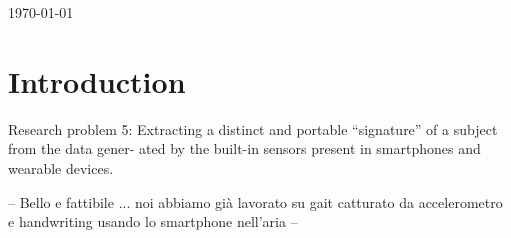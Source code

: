 \documentclass[12pt]{article}
\begin{document}
\begin{titlepage}


{\large \today}\\[2cm] %
























\vfill %


\end{titlepage}


\newpage
\tableofcontents
\newpage


\section{Introduction}

    Research problem 5: Extracting a distinct and
    portable “signature” of a subject from the data gener-
    ated by the built-in sensors present in smartphones and
    wearable devices.

    -- Bello e fattibile ... noi abbiamo già lavorato su gait catturato da accelerometro e handwriting usando lo smartphone nell'aria --
\end{document}
